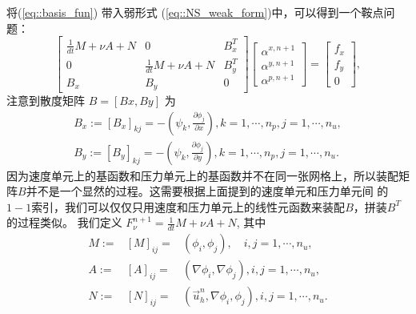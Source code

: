   将(\ref{eq::basis_fun}) 带入弱形式
  (\ref{eq::NS_weak_form})中，可以得到一个鞍点问题：
  \begin{equation}
    \left[
      \begin{array}{lll}
        \frac{1}{dt} M + \nu A + N & 0 & B_x^T \\
        0 & \frac{1}{dt} M +\nu A + N  & B_y^T \\
        B_x & B_y & 0
      \end{array}
    \right]
    \left[
      \begin{array}{c}
        \alpha^{x, n + 1} \\
        \alpha^{y, n + 1} \\
        \alpha^{p, n + 1}
      \end{array}
    \right] =
    \left[
      \begin{array}{c}
        f_x \\
        f_y \\
        0
      \end{array}
    \right],
    \label{eq::linear_system}
  \end{equation}
  注意到散度矩阵 $B = [Bx, By]$ 为
  \begin{eqnarray}
    B_x := [B_x]_{kj} = -\left(\psi_k, \frac{\partial \phi_j}{\partial
        x} \right), k = 1, \cdots, n_p, j = 1, \cdots, n_u, \\
    B_y := [B_y]_{kj} = -\left(\psi_k, \frac{\partial \phi_j}{\partial
        y} \right), k = 1, \cdots, n_p, j = 1, \cdots, n_u.
  \end{eqnarray}
  因为速度单元上的基函数和压力单元上的基函数并不在同一张网格上，所以装配矩阵$B$并不是一个显然的过程。这需要根据上面提到的速度单元和压力单元间
  的$1-1$索引，我们可以仅仅只用速度和压力单元上的线性元函数来装配$B$，拼装$B^T$的过程类似。
  我们定义 $F_\nu^{n + 1} = \frac{1}{dt} M + \nu A + N$, 其中
  \begin{eqnarray}
    M := &[M]_{ij} =& \left( \phi_i, \phi_j \right),\quad  i,j = 1, \cdots,
    n_u, \\
    A := &[A]_{ij} =& \left( \nabla \phi_i, \nabla \phi_j \right), i,j =
    1, \cdots, n_u, \\
    N := &[N]_{ij} =& \left(\vec{u}_h^n, \nabla \phi_i, \phi_j \right),
    i,j = 1, \cdots, n_u.
  \end{eqnarray}

